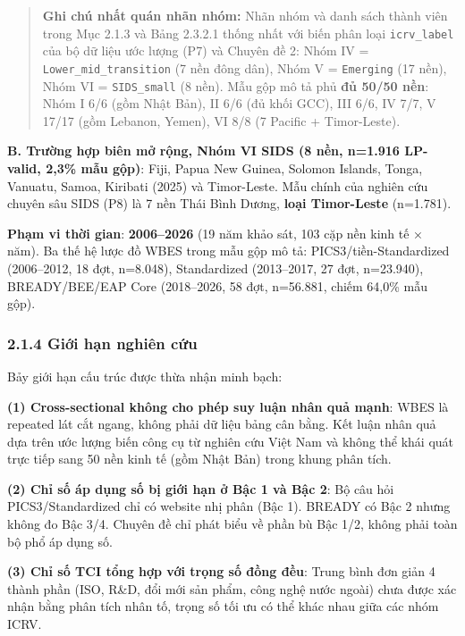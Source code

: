 \documentclass[
  a4paper,
  13pt]{extreport}
\begin{document}
\begin{quote}
\textbf{Ghi chú nhất quán nhãn nhóm:} Nhãn nhóm và danh sách thành viên
trong Mục 2.1.3 và Bảng 2.3.2.1 thống nhất với biến phân loại
\texttt{icrv\_label} của bộ dữ liệu ước lượng (P7) và Chuyên đề 2: Nhóm
IV = \texttt{Lower\_mid\_transition} (7 nền đông dân), Nhóm V =
\texttt{Emerging} (17 nền), Nhóm VI = \texttt{SIDS\_small} (8 nền). Mẫu
gộp mô tả phủ \textbf{đủ 50/50 nền}: Nhóm I 6/6 (gồm Nhật Bản), II 6/6
(đủ khối GCC), III 6/6, IV 7/7, V 17/17 (gồm Lebanon, Yemen), VI 8/8 (7
Pacific + Timor-Leste).
\end{quote}

\textbf{B. Trường hợp biên mở rộng, Nhóm VI SIDS (8 nền, n=1.916
LP-valid, 2,3\% mẫu gộp)}: Fiji, Papua New Guinea, Solomon Islands,
Tonga, Vanuatu, Samoa, Kiribati (2025) và Timor-Leste. Mẫu chính của
nghiên cứu chuyên sâu SIDS (P8) là 7 nền Thái Bình Dương, \textbf{loại
Timor-Leste} (n=1.781).

\textbf{Phạm vi thời gian}: \textbf{2006--2026} (19 năm khảo sát, 103
cặp nền kinh tế × năm). Ba thế hệ lược đồ WBES trong mẫu gộp mô tả:
PICS3/tiền-Standardized (2006--2012, 18 đợt, n=8.048), Standardized
(2013--2017, 27 đợt, n=23.940), BREADY/BEE/EAP Core (2018--2026, 58 đợt,
n=56.881, chiếm 64,0\% mẫu gộp).

\hypertarget{giux1edbi-hux1ea1n-nghiuxean-cux1ee9u}{%
\subsubsection{2.1.4 Giới hạn nghiên
cứu}\label{giux1edbi-hux1ea1n-nghiuxean-cux1ee9u}}

Bảy giới hạn cấu trúc được thừa nhận minh bạch:

\textbf{(1) Cross-sectional không cho phép suy luận nhân quả mạnh}: WBES
là repeated lát cắt ngang, không phải dữ liệu bảng cân bằng. Kết luận
nhân quả dựa trên ước lượng biến công cụ từ nghiên cứu Việt Nam và không
thể khái quát trực tiếp sang 50 nền kinh tế (gồm Nhật Bản) trong khung
phân tích.

\textbf{(2) Chỉ số áp dụng số bị giới hạn ở Bậc 1 và Bậc 2}: Bộ câu hỏi
PICS3/Standardized chỉ có website nhị phân (Bậc 1). BREADY có Bậc 2
nhưng không đo Bậc 3/4. Chuyên đề chỉ phát biểu về phần bù Bậc 1/2,
không phải toàn bộ phổ áp dụng số.

\textbf{(3) Chỉ số TCI tổng hợp với trọng số đồng đều}: Trung bình đơn
giản 4 thành phần (ISO, R\&D, đổi mới sản phẩm, công nghệ nước ngoài)
chưa được xác nhận bằng phân tích nhân tố, trọng số tối ưu có thể khác
nhau giữa các nhóm ICRV.
\end{document}
